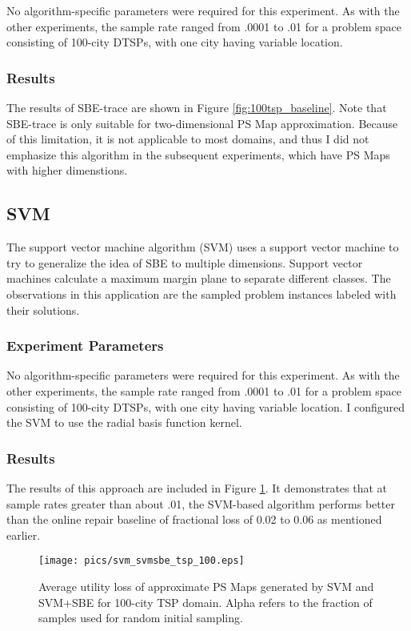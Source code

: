 No algorithm-specific parameters were required for this experiment.  As with the other experiments, the sample rate ranged from .0001 to .01 for a problem space consisting of 100-city DTSPs, with one city having variable location.

\subsubsection{Results}  The results of SBE-trace are shown in Figure \ref{fig:100tsp_baseline}.  Note that SBE-trace is only suitable for two-dimensional PS Map approximation.  Because of this limitation, it is not applicable to most domains, and thus I did not emphasize this algorithm in the subsequent experiments, which have PS Maps with higher dimenstions.


\subsection{SVM} 

The support vector machine algorithm (SVM) uses a support vector machine to try to generalize the idea of SBE to multiple dimensions.  Support vector machines calculate a maximum margin plane to separate different classes.  The observations in this application are the sampled problem instances labeled with their solutions.  

\subsubsection{Experiment Parameters}

No algorithm-specific parameters were required for this experiment.  As with the other experiments, the sample rate ranged from .0001 to .01 for a problem space consisting of 100-city DTSPs, with one city having variable location.  I configured the SVM to use the radial basis function kernel.

\subsubsection{Results}  The results of this approach are included in Figure \ref{fig:svm_svmsbe_tsp_100}.  It demonstrates that at sample rates greater than about .01, the SVM-based algorithm performs better than the online repair baseline of fractional loss of 0.02 to 0.06 as mentioned earlier.

\begin{figure}
\begin{center}
\texttt{[image: pics/svm\_svmsbe\_tsp\_100.eps]}
\caption{Average utility loss of approximate PS Maps generated by SVM and SVM+SBE for 100-city TSP domain. Alpha refers to the fraction of samples used for random initial sampling.}
\label{fig:svm_svmsbe_tsp_100}
\end{center}
\end{figure}


